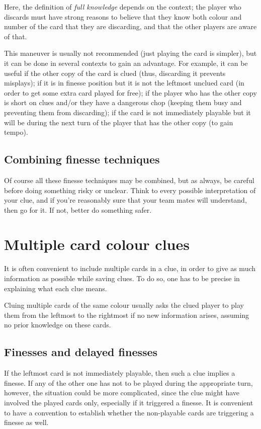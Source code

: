 \documentclass[a4paper]{article}
\theoremstyle{plain}
\theoremstyle{definition}
\begin{document}
Here, the definition of \emph{full knowledge} depends on the context; the player who discards must have strong reasons to believe that they know both colour and number of the card that they are discarding, and that the other players are aware of that.

This maneuver is usually not recommended (just playing the card is simpler), but it can be done in several contexts to gain an advantage. For example, it can be useful if the other copy of the card is clued (thus, discarding it prevents misplays); if it is in finesse position but it is not the leftmost unclued card (in order to get some extra card played for free); if the player who has the other copy is short on clues and/or they have a dangerous chop (keeping them busy and preventing them from discarding); if the card is not immediately playable but it will be during the next turn of the player that has the other copy (to gain tempo).

\subsection{Combining finesse techniques}

Of course all these finesse techniques may be combined, but as always, be careful before doing something risky or unclear. Think to every possible interpretation of your clue, and if you're reasonably sure that your team mates will understand, then go for it. If not, better do something safer.

\section{Multiple card colour clues}

It is often convenient to include multiple cards in a clue, in order to give as much information as possible while saving clues. To do so, one has to be precise in explaining what each clue means.

Cluing multiple cards of the same colour usually asks the clued player to play them from the leftmost to the rightmost if no new information arises, assuming no prior knowledge on these cards.

\subsection{Finesses and delayed finesses}

If the leftmost card is not immediately playable, then such a clue implies a finesse. If any of the other one has not to be played during the appropriate turn, however, the situation could be more complicated, since the clue might have involved the played cards only, especially if it triggered a finesse. It is convenient to have a convention to establish whether the non-playable cards are triggering a finesse as well.
\end{document}
